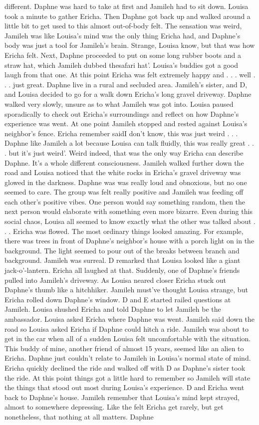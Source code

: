 \documentclass[12pt]{book}
\begin{document}
different. Daphne was hard to take at first and Jamileh had to sit down. Louisa took a minute to gather Ericha. Then Daphne got back up and walked around a little bit to get used to this almost out-of-body felt. The sensation was weird, Jamileh was like Louisa's mind was the only thing Ericha had, and Daphne's body was just a tool for Jamileh's brain. Strange, Louisa know, but that was how Ericha felt. Next, Daphne proceeded to put on some long rubber boots and a straw hat, which Jamileh dubbed thesafari hat'. Louisa's buddies got a good laugh from that one. At this point Ericha was felt extremely happy and . . .  well . . .  just great. Daphne live in a rural and secluded area. Jamileh's sister, and D, and Louisa decided to go for a walk down Ericha's long gravel driveway. Daphne walked very slowly, unsure as to what Jamileh was got into. Louisa paused sporadically to check out Ericha's surroundings and reflect on how Daphne's experience was went. At one point Jamileh stopped and rested against Louisa's neighbor's fence. Ericha remember saidI don't know, this was just weird . . .  Daphne like Jamileh a lot because Louisa can talk fluidly, this was really great . . .  but it's just weird'. Weird indeed, that was the only way Ericha can describe Daphne. It's a whole different consciousness. Jamileh walked further down the road and Louisa noticed that the white rocks in Ericha's gravel driveway was glowed in the darkness. Daphne was was really loud and obnoxious, but no one seemed to care. The group was felt really positive and Jamileh was feeding off each other's positive vibes. One person would say something random, then the next person would elaborate with something even more bizarre. Even during this social chaos, Louisa all seemed to know exactly what the other was talked about . . .  Ericha was flowed. The most ordinary things looked amazing. For example, there was trees in front of Daphne's neighbor's house with a porch light on in the background. The light seemed to pour out of the breaks between branch and background. Jamileh was surreal. D remarked that Louisa looked like a giant jack-o'-lantern. Ericha all laughed at that. Suddenly, one of Daphne's friends pulled into Jamileh's driveway. As Louisa neared closer Ericha stuck out Daphne's thumb like a hitchhiker. Jamileh must've thought Louisa strange, but Ericha rolled down Daphne's window. D and E started railed questions at Jamileh. Louisa shushed Ericha and told Daphne to let Jamileh be the ambassador. Louisa asked Ericha where Daphne was went. Jamileh said down the road so Louisa asked Ericha if Daphne could hitch a ride. Jamileh was about to get in the car when all of a sudden Louisa felt uncomfortable with the situation. This buddy of mine, another friend of almost 15 years, seemed like an alien to Ericha. Daphne just couldn't relate to Jamileh in Louisa's normal state of mind. Ericha quickly declined the ride and walked off with D as Daphne's sister took the ride. At this point things got a little hard to remember so Jamileh will state the things that stood out most during Louisa's experience. D and Ericha went back to Daphne's house. Jamileh remember that Louisa's mind kept strayed, almost to somewhere depressing. Like the felt Ericha get rarely, but get nonetheless, that nothing at all matters. Daphne 
\end{document}
